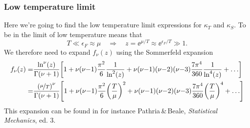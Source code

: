 \documentclass[11pt,letter, swedish, english
]{article}
\begin{document}
\subsubsection{Low temperature limit}

Here we're going to find the low temperature limit expressions for
$\kappa_T$ and $\kappa_S$.
To be in the limit of low temperature means that
\begin{equation}
T\ll\epsilon_F\approx\mu 
\quad\Longrightarrow\quad
z=\ee^{\mu/T}\approx \ee^{\epsilon_F/T}\gg1.
\end{equation}
We therefore need to expand $f_\nu(z)$ using the Sommerfeld
expansion\footnotemark{} 
\begin{equation}\label{eq:1_Sommerfeld}
\begin{aligned}
f_\nu(z)=&\frac{\ln^\nu(z)}{\Gamma(\nu+1)}\qty[
1+\nu(\nu{-}1)\frac{\pi^2}{6}\frac{1}{\ln^2(z)}
+\nu(\nu{-}1)(\nu{-}2)(\nu{-}3)\frac{7\pi^4}{360}\frac{1}{\ln^4(z)}
+\ldots]\\
=&\frac{\qty(\nicefrac{\mu}{T})^\nu}{\Gamma(\nu+1)}\qty[
1+\nu(\nu{-}1)\frac{\pi^2}{6}\qty(\frac{T}{\mu})^2
+\nu(\nu{-}1)(\nu{-}2)(\nu{-}3)\frac{7\pi^4}{360}\qty(\frac{T}{\mu})^4
+\ldots]
\end{aligned}
\end{equation}
This expansion can be found in for instance Pathria\,\&\,Beale,
\textit{Statistical Mechanics}, ed. 3.

\end{document}
